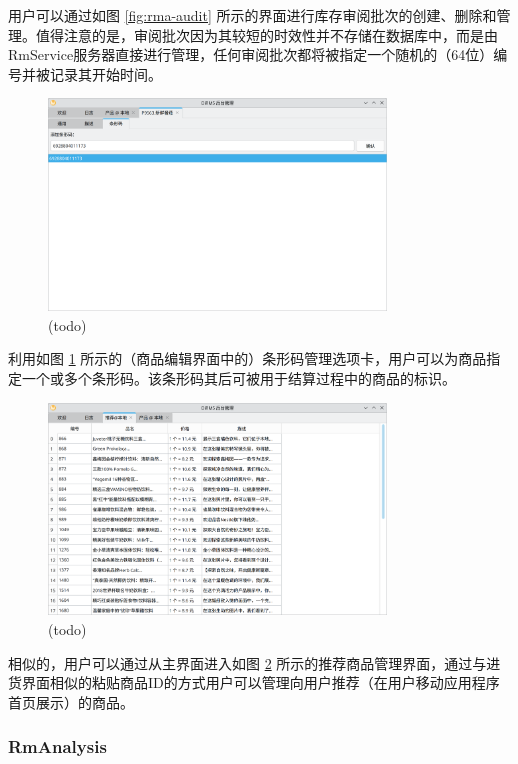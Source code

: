 用户可以通过如图 \ref{fig:rma-audit} 所示的界面进行库存审阅批次的创建、删除和管理。值得注意的是，审阅批次因为其较短的时效性并不存储在数据库中，而是由RmService服务器直接进行管理，任何审阅批次都将被指定一个随机的（64位）编号并被记录其开始时间。

\begin{figure}[htbp]
	\centering
	\includegraphics[width=0.8\textwidth]{./exp/rma-bc.png}
	\caption{(todo)}
	\label{fig:rma-bc}
\end{figure}

利用如图 \ref{fig:rma-bc} 所示的（商品编辑界面中的）条形码管理选项卡，用户可以为商品指定一个或多个条形码。该条形码其后可被用于结算过程中的商品的标识。

\begin{figure}[htbp]
	\centering
	\includegraphics[width=0.8\textwidth]{./exp/rma-feat.png}
	\caption{(todo)}
	\label{fig:rma-feat}
\end{figure}

相似的，用户可以通过从主界面进入如图 \ref{fig:rma-feat} 所示的推荐商品管理界面，通过与进货界面相似的粘贴商品ID的方式用户可以管理向用户推荐（在用户移动应用程序首页展示）的商品。

\subsubsection{RmAnalysis}

